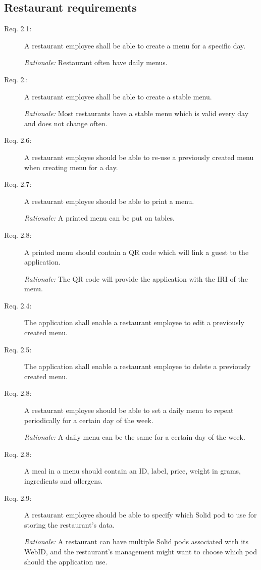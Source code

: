\subsection{Restaurant requirements}
\begin{description}
    \item [Req. 2.1:] A restaurant employee shall be able to create a menu for a specific day.

    \emph{Rationale:} Restaurant often have daily menus.
    \item [Req. 2.:] A restaurant employee shall be able to create a stable menu.

    \emph{Rationale:} Most restaurants have a stable menu which is valid every day and does not change often.
    \item [Req. 2.6:] A restaurant employee should be able to re-use a previously created menu when creating menu for a day.
    \item [Req. 2.7:] A restaurant employee should be able to print a menu.

    \emph{Rationale:} A printed menu can be put on tables.
    \item [Req. 2.8:] A printed menu should contain a QR code which will link a guest to the application.

    \emph{Rationale:} The QR code will provide the application with the IRI of the menu.
    \item [Req. 2.4:] The application shall enable a restaurant employee to edit a previously created menu.
    \item [Req. 2.5:] The application shall enable a restaurant employee to delete a previously created menu.
    \item [Req. 2.8:] A restaurant employee should be able to set a daily menu to repeat periodically for a certain day of the week.

    \emph{Rationale:} A daily menu can be the same for a certain day of the week.
    \item [Req. 2.8:] A meal in a menu should contain an ID, label, price, weight in grams, ingredients and allergens.
    \item [Req. 2.9:] A restaurant employee should be able to specify which Solid pod to use for storing the restaurant's data.

    \emph{Rationale:} A restaurant can have multiple Solid pods associated with its WebID, and the restaurant's management might want to choose which pod should the application use.
\end{description}

